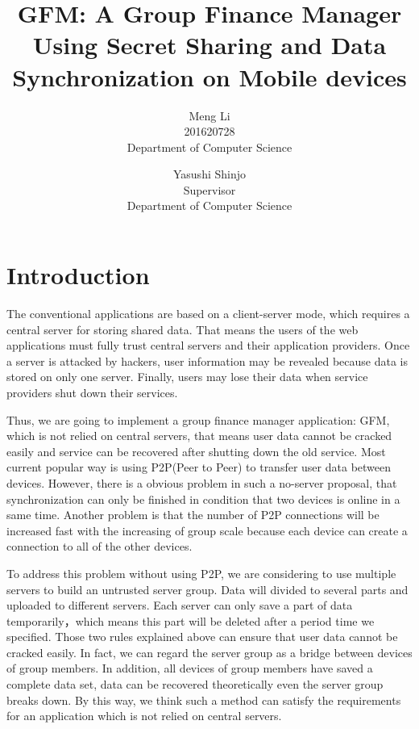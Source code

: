 \documentclass[twocolumn,10pt]{article}
\begin{document}
\date{}

\title{\bf GFM: A Group Finance Manager Using Secret Sharing and Data Synchronization on Mobile devices}

\author{
Meng Li\\
201620728\\
Department of Computer Science
\and
Yasushi Shinjo\\
Supervisor\\
Department of Computer Science
}

\maketitle

\section{Introduction}
The conventional applications are based on a client-server mode, which requires a central server for storing shared data. That means the users of the web applications must fully trust central servers and their application providers. Once a server is attacked by hackers, user information may be revealed because data is stored on only one server. Finally, users may lose their data when service providers shut down their services.

Thus, we are going to implement a group finance manager application: GFM, which is not relied on central servers, that means user data cannot be cracked easily and service can be recovered after shutting down the old service. Most current popular way is using P2P(Peer to Peer) to transfer user data between devices. However, there is a obvious problem in such a no-server proposal, that synchronization can only be finished in condition that two devices is online in a same time. Another problem is that the number of P2P connections will be increased fast with the increasing of group scale because each device can create a connection to all of the other devices. 

To address this problem without using P2P, we are considering to use multiple servers to build an untrusted server group. Data will divided to several parts and uploaded to different servers. Each server can only save a part of data temporarily，which means this part will be deleted after a period time we specified. Those two rules explained above can ensure that user data cannot be cracked easily. In fact, we can regard the server group as a bridge between devices of group members. In addition, all devices of group members have saved a complete data set, data can be recovered theoretically even the server group breaks down. By this way, we think such a method can satisfy the requirements for an application which is not relied on central servers.
\end{document}
